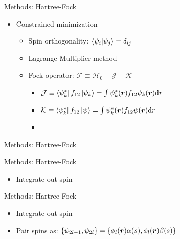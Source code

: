 \documentclass[10pt, t, xcolor=dvipsnames]{beamer}
\begin{document}
\begin{frame}[fragile]{Methods: Hartree-Fock}
    \begin{itemize}
        \item Constrained minimization
            \begin{itemize}
                \item Spin orthogonality: $\braket{\psi_i}{\psi_j} =
                    \delta_{ij}$
                \item Lagrange Multiplier method
                \item Fock-operator: $\mathcal{F} \equiv \mathcal{H}_0 + \mathcal{J} \pm \mathcal{K}$
                    \begin{itemize}
                        \item $\mathcal{J} \equiv
                            \bra{\psi^{*}_k}f_{12}\ket{\psi_k} = \int
                            \psi^{*}_k(\bm{{r}})f_{12}\psi_k(\bm{{r}})\mathrm{d} r$
                        \vsp
                        \item $\mathcal{K} \equiv
                            \bra{\psi^{*}_k}f_{12}\ket{\psi} = \int
                            \psi^{*}_k(\bm{{r}})f_{12}\psi(\bm{{r}})\mathrm{d} r$
                        \vsp
                        \item {}
                    \end{itemize}
            \end{itemize}
    \end{itemize}
\end{frame}

\begin{frame}[fragile]{Methods: Hartree-Fock}
\end{frame}

\begin{frame}[fragile]{Methods: Hartree-Fock}
    \begin{itemize}
        \item Integrate out spin
    \end{itemize}
\end{frame}

\begin{frame}[fragile]{Methods: Hartree-Fock}
    \begin{itemize}
        \item Integrate out spin
        \item Pair spins as: $\{\psi_{2l-1}, \psi_{2l}\} =
            \{\phi_l(\bm{{r}})\alpha(s),\phi_l(\bm{{r}})\beta(s)\}$
    \end{itemize}
\end{frame}
\end{document}
